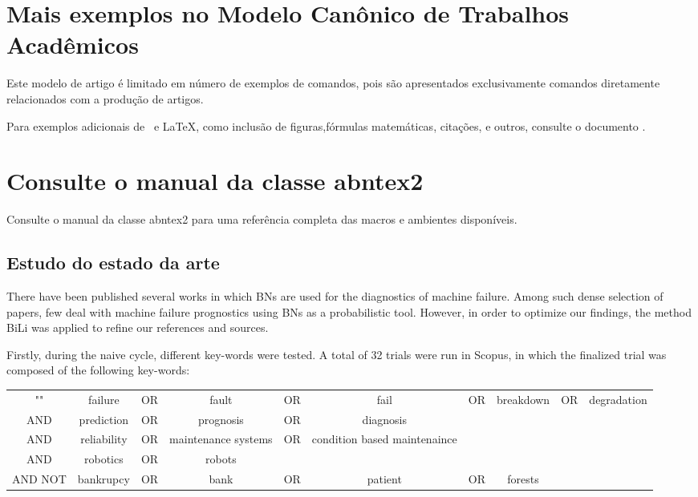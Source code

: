 \section{Mais exemplos no Modelo Canônico de Trabalhos Acadêmicos}

Este modelo de artigo é limitado em número de exemplos de comandos, pois são apresentados exclusivamente comandos diretamente relacionados com a produção de artigos.

Para exemplos adicionais de \abnTeX\ e \LaTeX, como inclusão de figuras,fórmulas matemáticas, citações, e outros, consulte o documento .

\section{Consulte o manual da classe \textsf{abntex2}}

Consulte o manual da classe \textsf{abntex2} \cite{abntex2classe} para uma referência completa das macros e ambientes disponíveis.

\subsection{Estudo do estado da arte}
There have been published several works in which BNs are used for the diagnostics of machine failure. Among such dense selection of papers, few deal with machine failure prognostics using BNs as a probabilistic tool. However, in order to optimize our findings, the method BiLi was applied to refine our references and sources.

Firstly, during the naive cycle, different key-words were tested. A total of 32 trials were run in Scopus, in which the finalized trial was composed of the following key-words:

\begin{center}
    \begin{tabular}{ c c c c c c c c c c }
        "" & failure & OR & fault & OR & fail & OR & breakdown & OR & degradation \\
        AND & prediction & OR & prognosis & OR & diagnosis \\
        AND & reliability & OR & maintenance systems & OR & condition based maintenaince \\
        AND & robotics & OR & robots \\
        AND NOT & bankrupcy & OR & bank & OR & patient & OR & forests

    \end{tabular}
\end{center}

